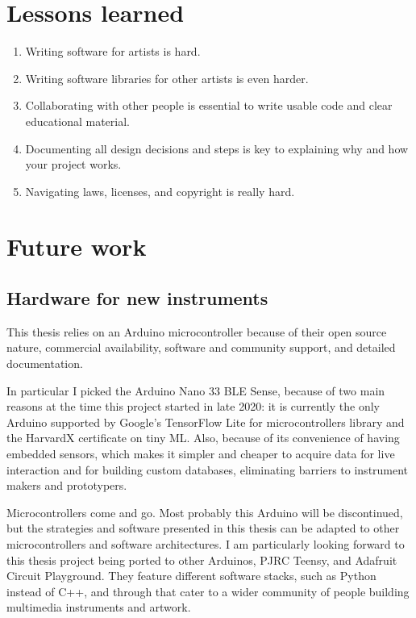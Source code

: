 \section{Lessons learned}

\begin{enumerate}
  \item Writing software for artists is hard.
  \item Writing software libraries for other artists is even harder.
  \item Collaborating with other people is essential to write usable code and clear educational material.
  \item Documenting all design decisions and steps is key to explaining why and how your project works.
  \item Navigating laws, licenses, and copyright is really hard.
\end{enumerate}

\section{Future work}

\subsection{Hardware for new instruments}

This thesis relies on an Arduino microcontroller because of their open source nature, commercial availability, software and community support, and detailed documentation.

In particular I picked the Arduino Nano 33 \acrshort{BLE} Sense, because of two main reasons at the time this project started in late 2020: it is currently the only Arduino supported by Google's TensorFlow Lite for microcontrollers library and the HarvardX certificate on tiny \acrshort{ML}. Also, because of its convenience of having embedded sensors, which makes it simpler and cheaper to acquire data for live interaction and for building custom databases, eliminating barriers to instrument makers and prototypers.

Microcontrollers come and go. Most probably this Arduino will be discontinued, but the strategies and software presented in this thesis can be adapted to other microcontrollers and software architectures. I am particularly looking forward to this thesis project being ported to other Arduinos, PJRC Teensy, and Adafruit Circuit Playground. They feature different software stacks, such as Python instead of C++, and through that cater to a wider community of people building multimedia instruments and artwork.

